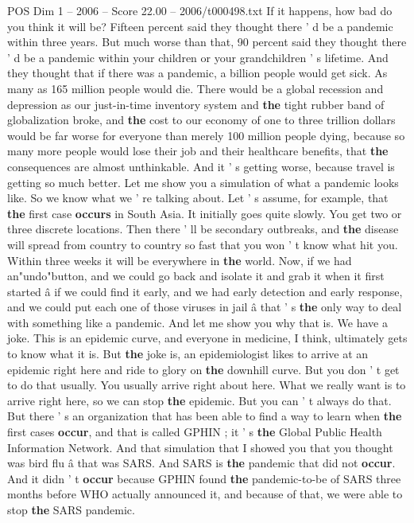 \begin{textsample}{POS Dim 1 – 2006 – Score 22.00 – 2006/t000498.txt}
If it happens, how bad do you think it will be?
Fifteen percent said they thought there ' d be a pandemic within three years.
But much worse than that, 90 percent said they thought there ' d be a pandemic within your children or your grandchildren ' s lifetime.
And they thought that if there was a pandemic, a billion people would get sick.
As many as 165 million people would die.
There would be a global recession and depression as our just-in-time inventory system and \textbf{the} tight rubber band of globalization broke, and \textbf{the} cost to our economy of one to three trillion dollars would be far worse for everyone than merely 100 million people dying, because so many more people would lose their job and their healthcare benefits, that \textbf{the} consequences are almost unthinkable.
And it ' s getting worse, because travel is getting so much better.
Let me show you a simulation of what a pandemic looks like.
So we know what we ' re talking about.
Let ' s assume, for example, that \textbf{the} first case \textbf{occurs} in South Asia.
It initially goes quite slowly.
You get two or three discrete locations.
Then there ' ll be secondary outbreaks, and \textbf{the} disease will spread from country to country so fast that you won ' t know what hit you.
Within three weeks it will be everywhere in \textbf{the} world.
Now, if we had an"undo"button, and we could go back and isolate it and grab it when it first started â if we could find it early, and we had early detection and early response, and we could put each one of those viruses in jail â that ' s \textbf{the} only way to deal with something like a pandemic.
And let me show you why that is.
We have a joke.
This is an epidemic curve, and everyone in medicine, I think, ultimately gets to know what it is.
But \textbf{the} joke is, an epidemiologist likes to arrive at an epidemic right here and ride to glory on \textbf{the} downhill curve.
But you don ' t get to do that usually.
You usually arrive right about here.
What we really want is to arrive right here, so we can stop \textbf{the} epidemic.
But you can ' t always do that.
But there ' s an organization that has been able to find a way to learn when \textbf{the} first cases \textbf{occur}, and that is called GPHIN ; it ' s \textbf{the} Global Public Health Information Network.
And that simulation that I showed you that you thought was bird flu â that was SARS.
And SARS is \textbf{the} pandemic that did not \textbf{occur}.
And it didn ' t \textbf{occur} because GPHIN found \textbf{the} pandemic-to-be of SARS three months before WHO actually announced it, and because of that, we were able to stop \textbf{the} SARS pandemic.

\end{textsample}
